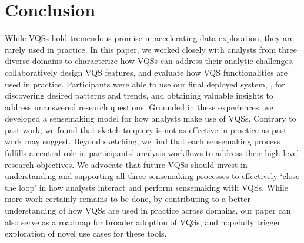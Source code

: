 \section{Conclusion\label{sec:conclusion}}
While VQSs hold tremendous promise in accelerating data exploration, they are rarely used in practice. In this paper, we worked closely with analysts from three diverse domains to characterize how VQSs can address their analytic challenges, collaboratively design VQS features, and evaluate how VQS functionalities are used in practice. Participants were able to use our final deployed system, \zvpp, for discovering desired patterns and trends, and obtaining valuable insights to address unanswered research questions. Grounded in these experiences, we developed a sensemaking model for how analysts make use of VQSs. Contrary to past work, we found that sketch-to-query is not as effective in practice as past work may suggest. Beyond sketching, we find that each sensemaking process fulfills a central role in participants' analysis workflows to address their high-level research objectives. We advocate that future VQSs should invest in understanding and supporting all three sensemaking processes to effectively `close the loop' in how analysts interact and perform sensemaking with VQSs. While more work certainly remains to be done, by contributing to a better understanding of how VQSs are used in practice across domains, our paper can also serve as a roadmap for broader adoption of VQSs,
and hopefully trigger exploration of novel use cases for these tools.
